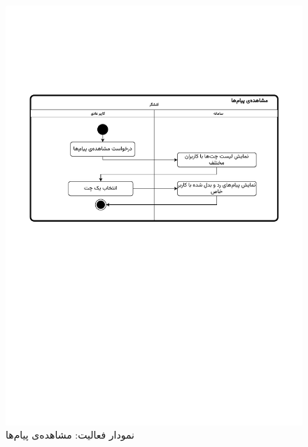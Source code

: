 \begin{figure}[ht!]
	\centering
	\includegraphics[scale=0.8, page=1]{figs/OOD-activity-chat.pdf}
	\caption{نمودار فعالیت: مشاهده‌ی پیام‌ها}
\end{figure}
\FloatBarrier
\newpage

